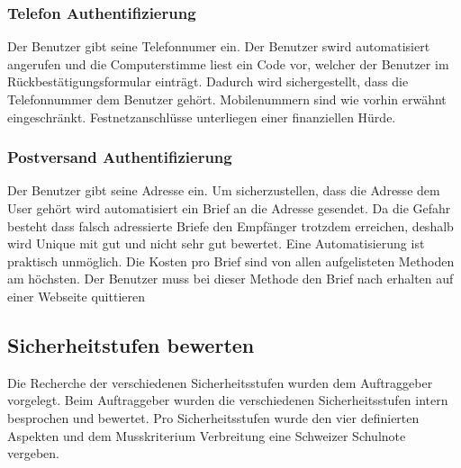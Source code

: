 \subsubsection{Telefon
Authentifizierung}\label{telefon-authentifizierung}

Der Benutzer gibt seine Telefonnumer ein. Der Benutzer swird
automatisiert angerufen und die Computerstimme liest ein Code vor,
welcher der Benutzer im Rückbestätigungsformular einträgt. Dadurch wird
sichergestellt, dass die Telefonnummer dem Benutzer gehört.
Mobilenummern sind wie vorhin erwähnt eingeschränkt. Festnetzanschlüsse
unterliegen einer finanziellen Hürde.

\subsubsection{Postversand
Authentifizierung}\label{postversand-authentifizierung}

Der Benutzer gibt seine Adresse ein. Um sicherzustellen, dass die
Adresse dem User gehört wird automatisiert ein Brief an die Adresse
gesendet. Da die Gefahr besteht dass falsch adressierte Briefe den
Empfänger trotzdem erreichen, deshalb wird Unique mit gut und nicht sehr
gut bewertet. Eine Automatisierung ist praktisch unmöglich. Die Kosten
pro Brief sind von allen aufgelisteten Methoden am höchsten. Der
Benutzer muss bei dieser Methode den Brief nach erhalten auf einer
Webseite quittieren

\subsection{Sicherheitstufen bewerten}\label{sicherheitstufen-bewerten}

Die Recherche der verschiedenen Sicherheitsstufen wurden dem
Auftraggeber vorgelegt. Beim Auftraggeber wurden die verschiedenen
Sicherheitsstufen intern besprochen und bewertet. Pro Sicherheitsstufen
wurde den vier definierten Aspekten und dem Musskriterium Verbreitung
eine Schweizer Schulnote vergeben.

